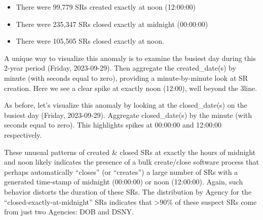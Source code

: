 \documentclass[12pt, titlepage]{article}
\begin{document}
	
\begin{itemize}
	 \item There were 99,779 SRs created exactly at noon (12:00:00)
	
	 \item There were 235,347 SRs closed exactly at midnight (00:00:00)
	 
	\item There were 105,505 SRs closed exactly at noon. 
\end{itemize}


A unique way to visualize this anomaly is to examine the busiest day 
during this 2-year period (Friday, 2023-09-29). Then aggregate 
the created\_date(s) by minute (with seconds equal to zero), providing
a minute-by-minute look at SR creation. Here we see a clear 
spike at exactly noon (12:00), well beyond the 3\textsigma line.



As before, let's visualize this anomaly by looking at the closed\_date(s) 
on the busiest day (Friday, 2023-09-29). Aggregate closed\_date(s) by 
the minute (with seconds equal to zero). This highlights spikes 
at 00:00:00 and 12:00:00 respectively. 




These unusual patterns of created \& closed SRs at exactly the hours 
of midnight and noon likely indicates the presence of a bulk create/close 
software process that perhaps automatically ``closes'' 
(or ``creates'') a large number of SRs with a generated time-stamp of 
midnight (00:00:00) or noon (12:00:00). Again, such behavior distorts
 the duration of these SRs. The distribution by Agency for 
 the ``closed-exactly-at-midnight'' SRs indicates that \textgreater90\% of 
 these suspect SRs come from just two Agencies: DOB and DSNY. 

	
\end{document}
